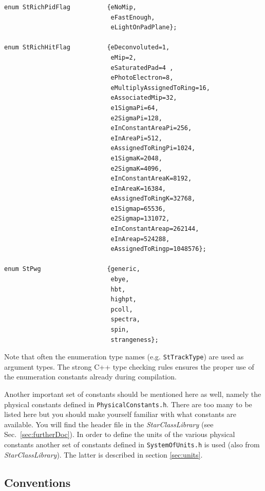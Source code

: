 \documentclass[twoside]{article}
\newcommand{\name}[1]{\textsl{#1}}%
\begin{document}
\begin{verbatim}
enum StRichPidFlag          {eNoMip,
                             eFastEnough,
                             eLightOnPadPlane};

enum StRichHitFlag          {eDeconvoluted=1,
                             eMip=2,
                             eSaturatedPad=4 ,
                             ePhotoElectron=8,
                             eMultiplyAssignedToRing=16,
                             eAssociatedMip=32,
                             e1SigmaPi=64,
                             e2SigmaPi=128,
                             eInConstantAreaPi=256,
                             eInAreaPi=512,
                             eAssignedToRingPi=1024,
                             e1SigmaK=2048,
                             e2SigmaK=4096,
                             eInConstantAreaK=8192,
                             eInAreaK=16384,
                             eAssignedToRingK=32768,
                             e1Sigmap=65536,
                             e2Sigmap=131072,
                             eInConstantAreap=262144,
                             eInAreap=524288,
                             eAssignedToRingp=1048576};

enum StPwg                  {generic,
                             ebye,
                             hbt,
                             highpt,
                             pcoll,
                             spectra,
                             spin,
                             strangeness};
\end{verbatim}

Note that often the enumeration type names (e.g. \texttt{StTrackType})
are used as argument types. The strong C++ type checking rules ensures
the proper use of the enumeration constants already during
compilation.

Another important set of constants should be mentioned here as well,
namely the physical constants defined in \texttt{PhysicalConstants.h}.
There are too many to be listed here but you should make yourself
familiar with what constants are available. You will find the header
file in the \name{StarClassLibrary} (see Sec.~\ref{sec:furtherDoc}).
 In order to define the units of the various
physical constants another set of constants defined in
\texttt{SystemOfUnits.h} is used (also from \name{StarClassLibrary}).
The latter is described in section \ref{sec:units}.

\subsection{Conventions}
\label{sec:conventions}
\end{document}
